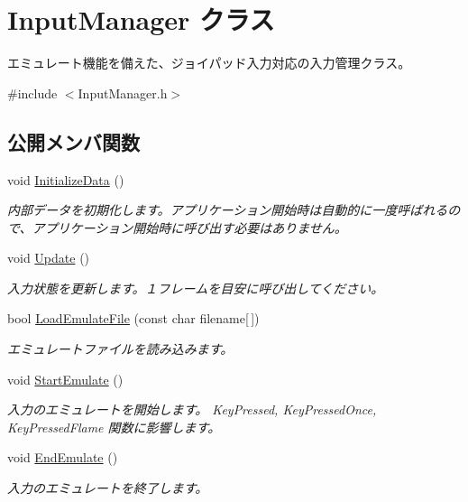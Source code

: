 \hypertarget{class_input_manager}{}\section{Input\+Manager クラス}
\label{class_input_manager}


エミュレート機能を備えた、ジョイパッド入力対応の入力管理クラス。 




{\ttfamily \#include $<$Input\+Manager.\+h$>$}

\subsection*{公開メンバ関数}
\begin{DoxyCompactItemize}
\item 
void \hyperlink{class_input_manager_a9d59fc26c033096c70554b725a5b34fa}{Initialize\+Data} ()
\begin{DoxyCompactList}\small\item\em 内部データを初期化します。アプリケーション開始時は自動的に一度呼ばれるので、アプリケーション開始時に呼び出す必要はありません。\end{DoxyCompactList}\item 
void \hyperlink{class_input_manager_aa5480931dba2720e7d80dd00a53adae0}{Update} ()
\begin{DoxyCompactList}\small\item\em 入力状態を更新します。１フレームを目安に呼び出してください。\end{DoxyCompactList}\item 
bool \hyperlink{class_input_manager_a4e2c0f85c865760531bc373d71180630}{Load\+Emulate\+File} (const char filename\mbox{[}$\,$\mbox{]})
\begin{DoxyCompactList}\small\item\em エミュレートファイルを読み込みます。\end{DoxyCompactList}\item 
void \hyperlink{class_input_manager_aed453ee1a1b372ff7ae1c9204272f8a3}{Start\+Emulate} ()
\begin{DoxyCompactList}\small\item\em 入力のエミュレートを開始します。 Key\+Pressed, Key\+Pressed\+Once, Key\+Pressed\+Flame 関数に影響します。 \end{DoxyCompactList}\item 
void \hyperlink{class_input_manager_a6658574be74485579cbd99e56b6abcec}{End\+Emulate} ()
\begin{DoxyCompactList}\small\item\em 入力のエミュレートを終了します。\end{DoxyCompactList}\item 

\end{DoxyCompactItemize}

